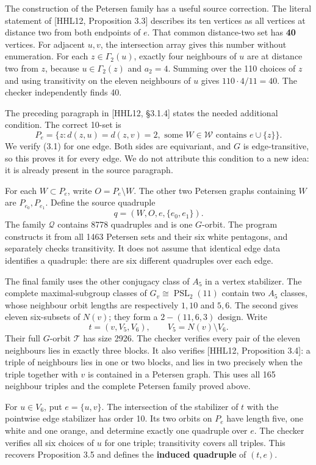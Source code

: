 The construction of the Petersen family has a useful source correction.
The literal statement of {[}HHL12, Proposition 3.3{]} describes its ten
vertices as all vertices at distance two from both endpoints of \(e\).
That common distance-two set has \textbf{40} vertices. For adjacent
\(u,v\), the intersection array gives this number without enumeration.
For each \(z\in\Gamma_2(u)\), exactly four neighbours of \(u\) are at
distance two from \(z\), because \(u\in\Gamma_2(z)\) and \(a_2=4\).
Summing over the 110 choices of \(z\) and using transitivity on the
eleven neighbours of \(u\) gives \(110\cdot4/11=40\). The checker
independently finds 40.

The preceding paragraph in {[}HHL12, §3.1.4{]} states the needed
additional condition. The correct 10-set is \[
 P_e=\{z:d(z,u)=d(z,v)=2,
       \text{ some }W\in\mathcal W\text{ contains }e\cup\{z\}\}.
 \tag{3.1}
\] We verify (3.1) for one edge. Both sides are equivariant, and \(G\)
is edge-transitive, so this proves it for every edge. We do not
attribute this condition to a new idea: it is already present in the
source paragraph.

For each \(W\subset P_e\), write \(O=P_e\setminus W\). The other two
Petersen graphs containing \(W\) are \(P_{e_0},P_{e_1}\). Define the
source quadruple \[
 q=(W,O,e,\{e_0,e_1\}).
\] The family \(\mathcal Q\) contains 8778 quadruples and is one
\(G\)-orbit. The program constructs it from all 1463 Petersen sets and
their six white pentagons, and separately checks transitivity. It does
not assume that identical edge data identifies a quadruple: there are
six different quadruples over each edge.

The final family uses the other conjugacy class of \(A_5\) in a vertex
stabilizer. The complete maximal-subgroup classes of
\(G_v\cong\operatorname{PSL}_2(11)\) contain two \(A_5\) classes, whose
neighbour orbit lengths are respectively \(1,10\) and \(5,6\). The
second gives eleven six-subsets of \(N(v)\); they form a
\(2\!-(11,6,3)\) design. Write \[
 t=(v,V_5,V_6),\qquad V_5=N(v)\setminus V_6.
\] Their full \(G\)-orbit \(\mathcal T\) has size 2926. The checker
verifies every pair of the eleven neighbours lies in exactly three
blocks. It also verifies {[}HHL12, Proposition 3.4{]}: a triple of
neighbours lies in one or two blocks, and lies in two precisely when the
triple together with \(v\) is contained in a Petersen graph. This uses
all 165 neighbour triples and the complete Petersen family proved above.

For \(u\in V_6\), put \(e=\{u,v\}\). The intersection of the stabilizer
of \(t\) with the pointwise edge stabilizer has order 10. Its two orbits
on \(P_e\) have length five, one white and one orange, and determine
exactly one quadruple over \(e\). The checker verifies all six choices
of \(u\) for one triple; transitivity covers all triples. This recovers
Proposition 3.5 and defines the \textbf{induced quadruple} of \((t,e)\).

